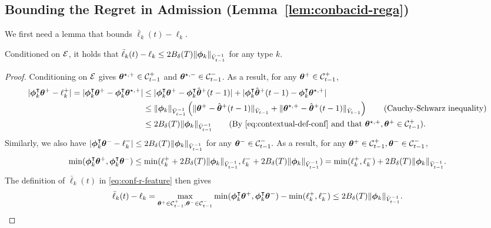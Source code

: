 \subsection{Bounding the Regret in Admission (Lemma~\ref{lem:conbacid-rega})}\label{app:lem-conbacid-rega}
We first need a lemma that bounds $\bar{\ell}_k(t) - \ell_k$.
\begin{lemma}\label{lem:bound-r-k-bar}
Conditioned on $\mathcal{E}$, it holds that $\bar{\ell}_k(t) - \ell_k \leq 2B_{\delta}(T)\|\boldsymbol{\phi}_k\|_{\bar{V}_{t-1}^{-1}}$ for any type $k$.
\end{lemma}
\begin{proof}
Conditioning on $\mathcal{E}$ gives $\boldsymbol{\theta}^{\star,+} \in \mathcal{C}^+_{t-1}$ and $\boldsymbol{\theta}^{\star,-} \in \mathcal{C}^-_{t-1}$. As a result, for any $\boldsymbol{\theta}^+ \in \mathcal{C}^+_{t-1}$, 
\begin{align*}
|\bphi_k^{\trans}\btheta^+ - \ell_k^+| = |\bphi_k^{\trans}\btheta^+ - \bphi_k^{\trans}\btheta^{\star,+}| &\leq |\bphi_k^{\trans}\btheta^+ - \bphi_k^{\trans}\hat{\btheta}^+(t-1)| + |\bphi_k^{\trans}\hat{\btheta}^+(t-1) - \bphi_k^{\trans}\btheta^{\star,+}| \\
&\leq \|\bphi_k\|_{\bar{V}_{t-1}^{-1}}\left(\|\btheta^+ - \hat{\btheta}^+(t-1)\|_{\bar{V}_{t-1}} + \|\btheta^{\star,+} - \hat{\btheta}^+(t-1)\|_{\bar{V}_{t-1}}\right) \tag{Cauchy-Schwarz inequality} \\
&\leq 2B_{\delta}(T)\|\bphi_k\|_{\bar{V}_{t-1}^{-1}} \tag{By \eqref{eq:contextual-def-conf} and that $\btheta^{\star,+},\btheta^+ \in \set{C}^+_{t-1}$}.
\end{align*}
Similarly, we also have $|\boldsymbol{\phi}_k^{\intercal}\boldsymbol{\theta}^- - \ell_k^-| \leq 2B_{\delta}(T)\|\boldsymbol{\phi}_k\|_{\bar{V}_{t-1}^{-1}}$ for any $\boldsymbol{\theta}^- \in \mathcal{C}_{t-1}^-.$ As a result, for any $\boldsymbol{\theta}^+ \in \mathcal{C}_{t-1}^+, \boldsymbol{\theta}^- \in \mathcal{C}_{t-1}^-$,
\[
\min(\boldsymbol{\phi}_k^{\intercal}\boldsymbol{\theta}^+,\boldsymbol{\phi}_k^{\intercal}\boldsymbol{\theta}^-) \leq \min(\ell_k^+ + 2B_{\delta}(T)\|\boldsymbol{\phi}_k\|_{\bar{V}_{t-1}^{-1}},\ell_k^- + 2B_{\delta}(T)\|\boldsymbol{\phi}_k\|_{\bar{V}_{t-1}^{-1}}) = \min(\ell_k^+,\ell_k^-) + 2B_{\delta}(T)\|\boldsymbol{\phi}_k\|_{\bar{V}_{t-1}^{-1}}.
\]
The definition of $\bar{\ell}_k(t)$ in \eqref{eq:conf-r-feature} then gives
\[
\bar{\ell}_k(t) - \ell_k = \max_{\boldsymbol{\theta}^+ \in \mathcal{C}_{t-1}^+, \boldsymbol{\theta}^- \in \mathcal{C}_{t-1}^-} \min(\boldsymbol{\phi}_k^{\intercal}\boldsymbol{\theta}^+,\boldsymbol{\phi}_k^{\intercal}\boldsymbol{\theta}^-) - \min(\ell_k^+,\ell_k^-) \leq 2B_{\delta}(T)\|\boldsymbol{\phi}_k\|_{\bar{V}_{t-1}^{-1}}.
\]
\end{proof}

